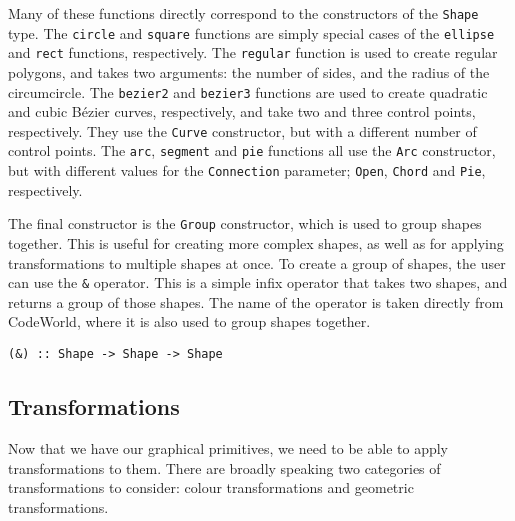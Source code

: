 \documentclass[../main.tex]{subfiles}
\begin{document}
                Many of these functions directly correspond to the constructors of the
                    \verb|Shape| type.
                The \verb|circle| and \verb|square| functions are simply special cases of the
                    \verb|ellipse| and \verb|rect| functions, respectively.
                The \verb|regular| function is used to create regular polygons, and takes two
                    arguments: the number of sides, and the radius of the circumcircle.
                The \verb|bezier2| and \verb|bezier3| functions are used to create quadratic
                    and cubic Bézier curves, respectively, and take two and three control points,
                    respectively.
                They use the \verb|Curve| constructor, but with a different number of control
                    points.
                The \verb|arc|, \verb|segment| and \verb|pie| functions all use the \verb|Arc|
                    constructor, but with different values for the \verb|Connection| parameter;
                    \verb|Open|, \verb|Chord| and \verb|Pie|, respectively.

                The final constructor is the \verb|Group| constructor, which is used to group
                    shapes together.
                This is useful for creating more complex shapes, as well as for applying
                    transformations to multiple shapes at once.
                To create a group of shapes, the user can use the \verb|&| operator.
                This is a simple infix operator that takes two shapes, and returns a group of
                    those shapes.
                The name of the operator is taken directly from CodeWorld, where it is also
                    used to group shapes together.

                \begin{lstlisting}[label={lst:group}, caption={The group operator.}]
(&) :: Shape -> Shape -> Shape\end{lstlisting}

        \subsection{Transformations}
            Now that we have our graphical primitives, we need to be able to apply
                transformations to them.
            There are broadly speaking two categories of transformations to consider:
                colour transformations and geometric transformations.
\end{document}
